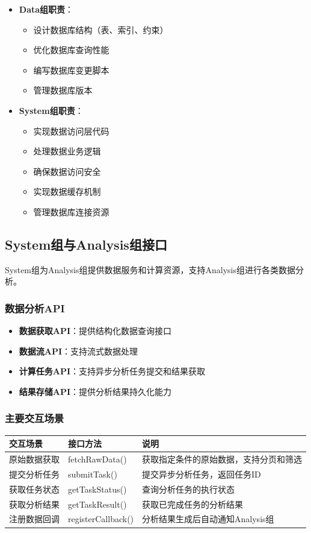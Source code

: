 \documentclass[a4paper,12pt]{article}
\begin{document}
\begin{itemize}
  \item \textbf{Data组职责}：
  \begin{itemize}
    \item 设计数据库结构（表、索引、约束）
    \item 优化数据库查询性能
    \item 编写数据库变更脚本
    \item 管理数据库版本
  \end{itemize}
  
  \item \textbf{System组职责}：
  \begin{itemize}
    \item 实现数据访问层代码
    \item 处理数据业务逻辑
    \item 确保数据访问安全
    \item 实现数据缓存机制
    \item 管理数据库连接资源
  \end{itemize}
\end{itemize}

\subsection{System组与Analysis组接口}

System组为Analysis组提供数据服务和计算资源，支持Analysis组进行各类数据分析。

\subsubsection{数据分析API}

\begin{itemize}
  \item \textbf{数据获取API}：提供结构化数据查询接口
  \item \textbf{数据流API}：支持流式数据处理
  \item \textbf{计算任务API}：支持异步分析任务提交和结果获取
  \item \textbf{结果存储API}：提供分析结果持久化能力
\end{itemize}

\subsubsection{主要交互场景}

\begin{longtable}{|p{3cm}|p{4cm}|p{8cm}|}
\hline
\textbf{交互场景} & \textbf{接口方法} & \textbf{说明} \\
\hline
\endhead
原始数据获取 & fetchRawData() & 获取指定条件的原始数据，支持分页和筛选 \\
\hline
提交分析任务 & submitTask() & 提交异步分析任务，返回任务ID \\
\hline
获取任务状态 & getTaskStatus() & 查询分析任务的执行状态 \\
\hline
获取分析结果 & getTaskResult() & 获取已完成任务的分析结果 \\
\hline
注册数据回调 & registerCallback() & 分析结果生成后自动通知Analysis组 \\
\hline
\end{longtable}
\end{document}
